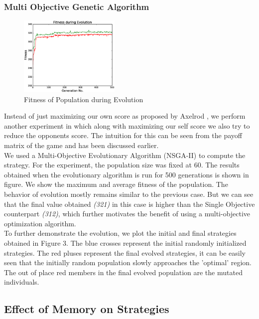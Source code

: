 \documentclass[a4paper]{article}
\begin{document}
	\subsubsection{Multi Objective Genetic Algorithm}
		
	\begin{figure}
	\centering
	\includegraphics[width=0.43\textwidth]{multFitPlot.eps}
	\caption{\footnotesize{Fitness of Population during Evolution}}
	\end{figure}
	
	Instead of just maximizing our own score as proposed by Axelrod \cite{axelrod}, we perform another experiment in which along with maximizing our self score we also try to reduce the opponents score. The intuition for this can be seen from the payoff matrix of the game and has been discussed earlier.\\
	We used a Multi-Objective Evolutionary Algorithm (NSGA-II) \cite{nsga} to compute the strategy. For the experiment, the population size was fixed at 60. The results obtained when the evolutionary algorithm is run for 500 generations is shown in figure. We show the maximum and average fitness of the population. The behavior of evolution mostly remains similar to the previous case. But we can see that the final value obtained \textit{(321)} in this case is higher than the Single Objective counterpart \textit{(312)}, which further motivates the benefit of using a multi-objective optimization algorithm.\\

	To further demonstrate the evolution, we plot the initial and final strategies obtained in Figure 3. The blue crosses represent the initial randomly initialized strategies. The red pluses represent the final evolved strategies, it can be easily seen that the initially random population slowly approaches the 'optimal' region. The out of place red members in the final evolved population are the mutated individuals.
	
	\subsection{Effect of Memory on Strategies}
	
\end{document}
